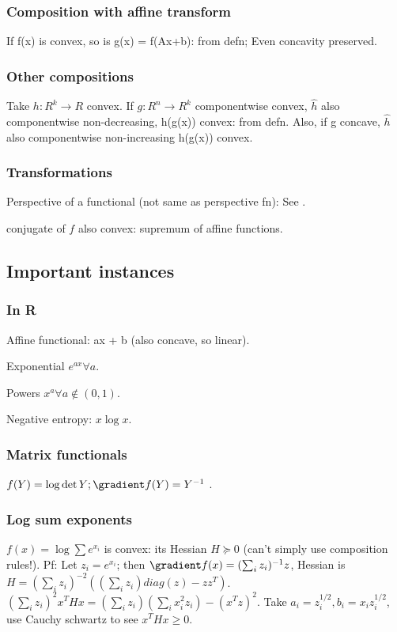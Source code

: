 \documentclass[oneside, article]{memoir}
\begin{document}
\subsubsection{Composition with affine transform}
If f(x) is convex, so is g(x) = f(Ax+b): from defn; Even concavity preserved.

\subsubsection{Other compositions}
Take $h:R^{k}\to R$ convex. If $g:R^{n} \to R^{k}$ componentwise convex, $\hat{h}$ also componentwise non-decreasing, h(g(x)) convex: from defn. Also, if g concave, $\hat{h}$ also componentwise non-increasing h(g(x)) convex.

\subsubsection{Transformations}
Perspective of a functional (not same as perspective fn): See \cite{cvx_boydVan}.

conjugate of $f$ also convex: supremum of affine functions.


\subsection{Important instances}
\subsubsection{In R}
Affine functional: ax + b (also concave, so linear).

Exponential $e^{ax} \forall a$.

Powers $x^{a} \forall a \notin (0,1)$.

Negative entropy: $x \log x$.

\subsubsection{Matrix functionals}
$f(Y) = \log \det Y; \gradient f(Y) = Y^{-1}$ \why.

\subsubsection{Log sum exponents}
$f(x) = \log \sum e^{x_i}$ is convex: its Hessian $H \succeq 0$ (can't simply use composition rules!). Pf: Let $z_i = e^{x_i}$; then $\gradient f(x) = (\sum_i z_i)^{-1}z$, Hessian is $H = (\sum_i z_i)^{-2}((\sum_i z_i)diag(z) -zz^{T})$. $(\sum_i z_i)^{2}x^{T}Hx = (\sum_i z_i)(\sum_i x_i^{2}z_i) - (x^{T}z)^{2}$. Take $a_i = z_i^{1/2}, b_i = x_i z_i^{1/2}$, use Cauchy schwartz to see $x^{T}Hx \geq 0$.
\end{document}
